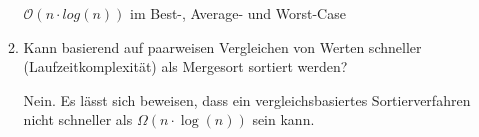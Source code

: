 \documentclass{lehramt-informatik-aufgabe}
\begin{document}
\begin{enumerate}
\begin{enumerate}
\begin{liAntwort}
$\mathcal{O}(n \cdot log(n))$ im Best-, Average- und Worst-Case
\end{liAntwort}

\item Kann basierend auf paarweisen Vergleichen von Werten schneller
(Laufzeitkomplexität) als Mergesort sortiert werden?

\begin{liAntwort}
Nein. Es lässt sich beweisen, dass ein vergleichsbasiertes
Sortierverfahren nicht schneller als $\Omega (n\cdot \log(n))$ sein
kann.
\end{liAntwort}
\end{enumerate}
\end{enumerate}
\end{document}
